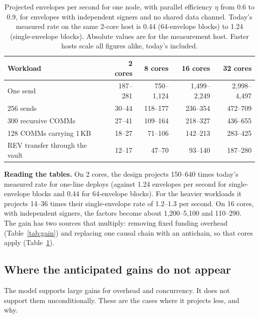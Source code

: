 \documentclass[11pt]{article}
\begin{document}
\begin{table}[h]
\centering\small
\begin{tabular}{@{}lrrrr@{}}
\toprule
\textbf{Workload} & \textbf{2 cores} & \textbf{8 cores} & \textbf{16 cores} & \textbf{32 cores} \\
\midrule
One send & 187--281 & 750--1{,}124 & 1{,}499--2{,}249 & 2{,}998--4{,}497 \\
256 sends & 30--44 & 118--177 & 236--354 & 472--709 \\
300 recursive COMMs & 27--41 & 109--164 & 218--327 & 436--655 \\
128 COMMs carrying 1\,KB & 18--27 & 71--106 & 142--213 & 283--425 \\
REV transfer through the vault & 12--17 & 47--70 & 93--140 & 187--280 \\
\bottomrule
\end{tabular}
\caption{Projected envelopes per second for one node, with parallel efficiency $\eta$ from 0.6 to 0.9, for envelopes with independent signers and no shared data channel. Today's measured rate on the same 2-core host is 0.44 (64-envelope blocks) to 1.24 (single-envelope blocks). Absolute values are for the measurement host. Faster hosts scale all figures alike, today's included.}
\label{tab:throughput}
\end{table}

\textbf{Reading the tables.} On 2 cores, the design projects 150--640 times today's measured rate for one-line deploys (against 1.24 envelopes per second for single-envelope blocks and 0.44 for 64-envelope blocks). For the heavier workloads it projects 14--36 times their single-envelope rate of 1.2--1.3 per second. On 16 cores, with independent signers, the factors become about 1{,}200--5{,}100 and 110--290. The gain has two sources that multiply: removing fixed funding overhead (Table~\ref{tab:gain}) and replacing one causal chain with an antichain, so that cores apply (Table~\ref{tab:throughput}).



\subsection{Where the anticipated gains do not appear}\label{sec:limits}

The model supports large gains for overhead and concurrency. It does not support them unconditionally. These are the cases where it projects less, and why.
\end{document}
